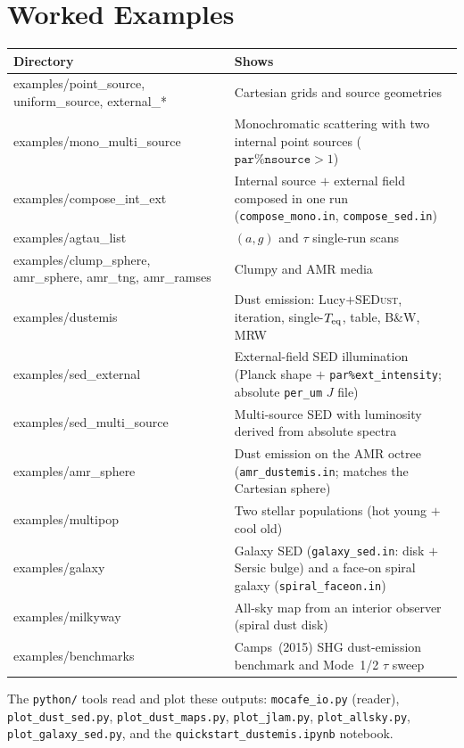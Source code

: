\documentclass[english,a4paper]{kiseon_memo}
\newcommand{\pp}[1]{\texttt{par\%#1}}
\newcommand{\code}[1]{\texttt{#1}}
\newcommand{\file}[1]{\texttt{#1}}
\begin{document}
\section{Worked Examples}
\begin{longtable}{P X}
\toprule
\textrm{Directory} & \textrm{Shows}\\
\midrule \endhead
examples/point\_source, uniform\_source, external\_* & Cartesian grids and source geometries\\
examples/mono\_multi\_source & Monochromatic scattering with two internal point sources ($\pp{nsource}>1$)\\
examples/compose\_int\_ext & Internal source $+$ external field composed in one run (\file{compose\_mono.in}, \file{compose\_sed.in})\\
examples/agtau\_list & $(a,g)$ and $\tau$ single-run scans\\
examples/clump\_sphere, amr\_sphere, amr\_tng, amr\_ramses & Clumpy and AMR media\\
examples/dustemis & Dust emission: Lucy$+$\textsc{SEDust}, iteration, single-$T_{\rm eq}$, table, B\&W, MRW\\
examples/sed\_external & External-field SED illumination (Planck shape $+$ \pp{ext\_intensity}; absolute \code{per\_um} $J$ file)\\
examples/sed\_multi\_source & Multi-source SED with luminosity derived from absolute spectra\\
examples/amr\_sphere & Dust emission on the AMR octree (\file{amr\_dustemis.in}; matches the Cartesian sphere)\\
examples/multipop & Two stellar populations (hot young $+$ cool old)\\
examples/galaxy   & Galaxy SED (\file{galaxy\_sed.in}: disk $+$ Sersic bulge) and a face-on spiral galaxy (\file{spiral\_faceon.in})\\
examples/milkyway & All-sky map from an interior observer (spiral dust disk)\\
examples/benchmarks & Camps~(2015) SHG dust-emission benchmark and Mode~1/2 $\tau$ sweep\\
\bottomrule
\end{longtable}
The \file{python/} tools read and plot these outputs: \file{mocafe\_io.py}
(reader), \file{plot\_dust\_sed.py}, \file{plot\_dust\_maps.py},
\file{plot\_jlam.py}, \file{plot\_allsky.py}, \file{plot\_galaxy\_sed.py}, and
the \file{quickstart\_dustemis.ipynb} notebook.
\end{document}
